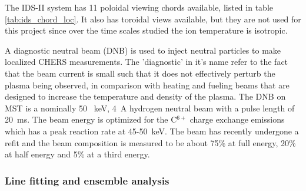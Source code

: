 The IDS-II system has 11 poloidal viewing chords available, listed in table \ref{tab:ids_chord_loc}. It also has toroidal views available, but they are not used for this project since over the time scales studied the ion temperature is isotropic. 

A diagnostic neutral beam (DNB) is used to inject neutral particles to make localized CHERS measurements. The 'diagnostic' in it's name refer to the fact that the beam current is small such that it does not effectively perturb the plasma being observed, in comparison with heating and fueling beams that are designed to increase the temperature and density of the plasma. The DNB on MST is a nominally 50 ~keV, 4~A hydrogen neutral beam with a pulse length of 20~ms\cite{Feng2016}. The beam energy is optimized for the C$^{6+}$ charge exchange emissions which has a peak reaction rate at 45-50~keV. The beam has recently undergone a refit and the beam composition is measured to be about 75\% at full energy, 20\% at half energy and 5\% at a third energy.\cite{Feng2016}

\subsubsection{Line fitting and ensemble analysis}

